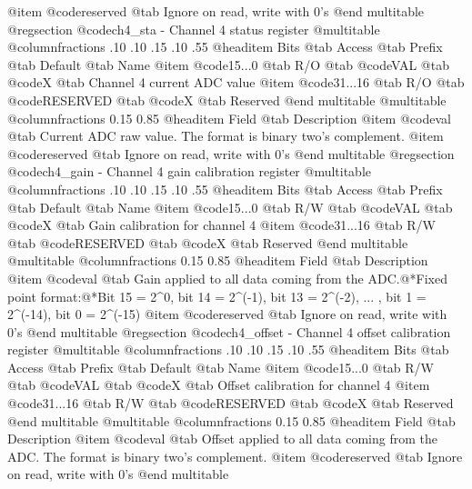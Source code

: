 @item @code{reserved} @tab Ignore on read, write with 0's
@end multitable
@regsection @code{ch4_sta} - Channel 4 status register
@multitable @columnfractions .10 .10 .15 .10 .55
@headitem Bits @tab Access @tab Prefix @tab Default @tab Name
@item @code{15...0}
@tab R/O @tab
@code{VAL}
@tab @code{X} @tab 
Channel 4 current ADC value
@item @code{31...16}
@tab R/O @tab
@code{RESERVED}
@tab @code{X} @tab 
Reserved
@end multitable
@multitable @columnfractions 0.15 0.85
@headitem Field @tab Description
@item @code{val} @tab Current ADC raw value. The format is binary two's complement.
@item @code{reserved} @tab Ignore on read, write with 0's
@end multitable
@regsection @code{ch4_gain} - Channel 4 gain calibration register
@multitable @columnfractions .10 .10 .15 .10 .55
@headitem Bits @tab Access @tab Prefix @tab Default @tab Name
@item @code{15...0}
@tab R/W @tab
@code{VAL}
@tab @code{X} @tab 
Gain calibration for channel 4
@item @code{31...16}
@tab R/W @tab
@code{RESERVED}
@tab @code{X} @tab 
Reserved
@end multitable
@multitable @columnfractions 0.15 0.85
@headitem Field @tab Description
@item @code{val} @tab Gain applied to all data coming from the ADC.@*Fixed point format:@*Bit 15 = 2^0, bit 14 = 2^(-1), bit 13 = 2^(-2), ... , bit 1 = 2^(-14), bit 0 = 2^(-15)
@item @code{reserved} @tab Ignore on read, write with 0's
@end multitable
@regsection @code{ch4_offset} - Channel 4 offset calibration register
@multitable @columnfractions .10 .10 .15 .10 .55
@headitem Bits @tab Access @tab Prefix @tab Default @tab Name
@item @code{15...0}
@tab R/W @tab
@code{VAL}
@tab @code{X} @tab 
Offset calibration for channel 4
@item @code{31...16}
@tab R/W @tab
@code{RESERVED}
@tab @code{X} @tab 
Reserved
@end multitable
@multitable @columnfractions 0.15 0.85
@headitem Field @tab Description
@item @code{val} @tab Offset applied to all data coming from the ADC. The format is binary two's complement.
@item @code{reserved} @tab Ignore on read, write with 0's
@end multitable
